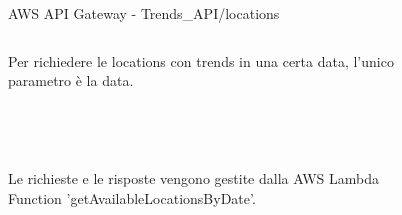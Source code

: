 \documentclass[xcolor=svgnames, aspectratio=169]{beamer}
\begin{document}

\begin{frame}{AWS API Gateway - Trends\_API/locations}
    \fontsize{10pt}{10}\selectfont
    \begin{columns}[t]
        Per richiedere le locations con trends in una certa data, l'unico parametro è la data.\\~\\~\\~\\~\\
        
        Le richieste e le risposte vengono gestite dalla AWS Lambda Function 'getAvailableLocationsByDate'.
        \vspace*{-16pt}
        \begin{figure}[H]
            \centering
            \noindent{}
        \end{figure}
    \end{columns}
\end{frame}

\end{document}
